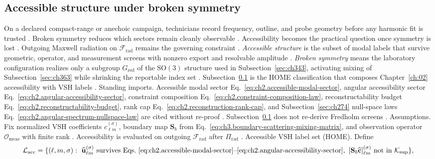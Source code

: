 \subsection{Accessible structure under broken symmetry}
\label{sec:ch364}
On a declared compact-range or anechoic campaign, technicians record frequency, outline, and probe geometry before any harmonic fit is trusted \cite{hansen1988}. Broken symmetry reduces which sectors remain cleanly observable \cite{stratton1941}. Accessibility becomes the practical question once symmetry is lost \cite{devaney2004}. Outgoing Maxwell radiation on $\mathcal{F}_{\mathrm{rad}}$ remains the governing constraint \cite{stratton1941}.
\emph{Accessible structure} is the subset of modal labels that survive geometric, operator, and measurement screens
with nonzero export and resolvable amplitude \cite{harrington2001}.
\emph{Broken symmetry} means the laboratory configuration realizes only a subgroup \(G_{\mathrm{red}}\) of the
\(\mathrm{SO}(3)\) structure used in Subsection~\ref{sec:ch343}, activating mixing of Subsection~\ref{sec:ch363}
while shrinking the reportable index set \cite{jackson1999}. Subsection~\ref{sec:ch364} is the HOME
classification that composes Chapter~\ref{ch:02} accessibility with VSH labels \cite{stratton1941}.
Standing imports. Accessible modal sector Eq.~\eqref{eq:ch2.accessible-modal-sector}, angular accessibility sector
Eq.~\eqref{eq:ch2.angular-accessibility-sector}, constraint composition
Eq.~\eqref{eq:ch2.constraint-composition-law}, reconstructability budget
Eq.~\eqref{eq:ch2.reconstructability-budget}, rank cap Eq.~\eqref{eq:ch2.reconstruction-rank-cap}, and
Subsection~\ref{sec:ch274} null-space laws Eq.~\eqref{eq:ch2.angular-spectrum-nullspace-law} are cited without
re-proof \cite{harrington2001}. Subsection~\ref{sec:ch364} does not re-derive Fredholm screens
\cite{harrington2001}.
Assumptions. Fix normalized VSH coefficients \(\widehat{c}_{\ell m}^{(\sigma)}\), boundary map \(\mathbf{S}_{b}\) from
Eq.~\eqref{eq:ch3.boundary-scattering-mixing-matrix}, and observation operator \(\mathcal{O}_{\mathrm{meas}}\) with
finite rank \cite{harrington2001}. Accessibility is evaluated on outgoing \(\mathcal{F}_{\mathrm{rad}}\)
after \(\Pi_{\mathrm{rad}}\) \cite{harrington2001}.
Accessible VSH label set (HOME). Define
\begin{equation}
\label{eq:ch3.accessible-VSH-label-set}
\mathcal{L}_{\mathrm{acc}}
=
\{(\ell,m,\sigma):\ 
\widehat{\mathbf{u}}_{\ell m}^{(\sigma)}\ \text{survives Eqs.~\eqref{eq:ch2.accessible-modal-sector}--\eqref{eq:ch2.angular-accessibility-sector}},\
[\mathbf{S}_{b}\widehat{\mathbf{c}}]_{\ell m}^{(\sigma)}\ \text{not in }\mathcal{K}_{\mathrm{sup}}
\},
\end{equation}
